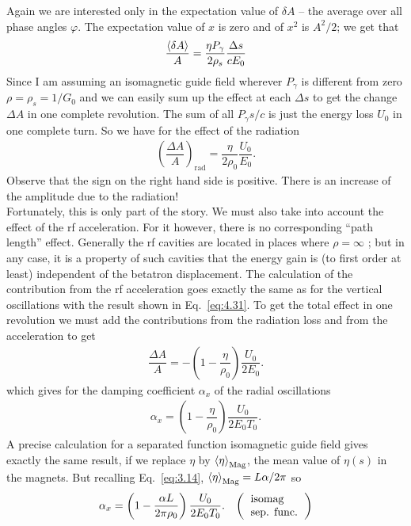 Again we are interested only in the expectation value of $\delta A$ -- the average over all
phase angles $\varphi$. The expectation value of $x$ is zero and of $x^2$ is $A^2/2$; we get that
\begin{align}
	\dfrac{\left< \delta A \right>}{A} = \dfrac{\eta P_\gamma}{2 \rho_s} \dfrac{\Delta s}{cE_0}
\end{align}
Since I am assuming an isomagnetic guide field wherever $P_\gamma$ is different from zero $\rho = \rho_s = 1/G_0$ and we can easily sum up the effect at each $\Delta s$ to get the change $\Delta A$ in one complete revolution. The sum of all $P_\gamma s/c$ is just the energy loss $U_0$ in one complete turn. So we have for the effect of the radiation
\begin{align}
	\left( \dfrac{\Delta A}{A} \right)_\text{rad} = \dfrac{\eta}{2\rho_0}\dfrac{U_0}{E_0}.
\end{align}
Observe that the sign on the right hand side is positive. There is an increase of the amplitude
 due to the radiation!\\
Fortunately, this is only part of the story. We must also take into account the effect of the rf acceleration. For it however, there is no corresponding ``path length'' effect. Generally the rf cavities are located in places where $\rho = \infty$ ; but in any case, it is a property of such cavities that the energy gain is (to first order at least) independent of the betatron displacement. The calculation of the contribution from the rf acceleration goes exactly the same as for the vertical oscillations with the result shown in Eq.~\eqref{eq:4.31}. To get the total effect in one revolution we must add the contributions from the radiation loss and from the acceleration to get
\begin{align}
	\dfrac{\Delta A}{A} = - \left(1 - \dfrac{\eta}{\rho_0} \right) \dfrac{U_0}{2 E_0}.
\end{align}
which gives for the damping coefficient $\alpha_x$ of the radial oscillations
\begin{align}\label{eq:4.48}
	\alpha_x = \left(1 - \dfrac{\eta}{\rho_0} \right) \dfrac{U_0}{2 E_0 T_0}.
\end{align}
A precise calculation for a separated function isomagnetic guide field gives exactly the same result, if we replace $\eta$ by $\left< \eta \right>_\text{Mag}$, the mean value of $\eta(s)$ in the magnets. But recalling Eq.~\eqref{eq:3.14}, $\left< \eta \right>_\text{Mag} = L\alpha/2\pi$ so
\begin{align} \label{eq:4.49}
	\alpha_x = \left(1 - \dfrac{\alpha L}{2\pi\rho_0} \right) \dfrac{U_0}{2 E_0 T_0}. && \left(\begin{tabular}{l}
\text{isomag} \\
\text{sep. func.}
\end{tabular}\right)
\end{align}
